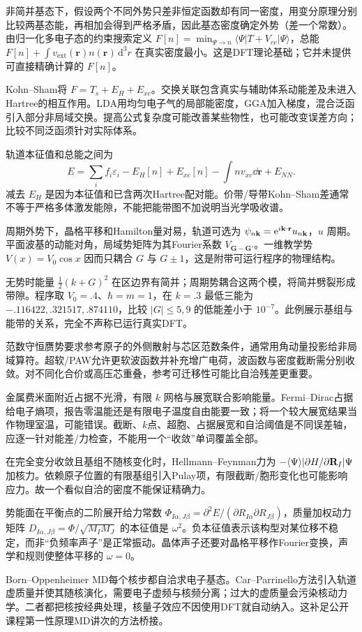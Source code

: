 非简并基态下，假设两个不同外势只差非恒定函数却有同一密度，用变分原理分别比较两基态能，再相加会得到严格矛盾，因此基态密度确定外势（差一个常数）。由归一化多电子态的约束搜索定义 $F[n]=\min_{\Psi\to n}\langle\Psi|T+V_{ee}|\Psi\rangle$，总能 $F[n]+\int v_{\mathrm{ext}}(\mathbf r)n(\mathbf r)\,\mathrm d^3r$ 在真实密度最小。这是DFT理论基础；它并未提供可直接精确计算的 $F[n]$。

Kohn--Sham将 $F=T_s+E_H+E_{xc}$。交换关联包含真实与辅助体系动能差及未进入Hartree的相互作用。LDA用均匀电子气的局部能密度，GGA加入梯度，混合泛函引入部分非局域交换。提高公式复杂度可能改善某些物性，也可能改变误差方向；比较不同泛函须针对实际体系。

轨道本征值和总能之间为
\[
E=\sum_i f_i\varepsilon_i-E_H[n]+E_{xc}[n]-\int n v_{xc}\dd\mathbf r+E_{NN}.
\]
减去 $E_H$ 是因为本征值和已含两次Hartree配对能。价带/导带Kohn--Sham差通常不等于严格多体激发能隙，不能把能带图不加说明当光学吸收谱。

周期外势下，晶格平移和Hamilton量对易，轨道可选为 $\psi_{n\mathbf k}=\mathrm e^{i\mathbf k\cdot\mathbf r}u_{n\mathbf k}$，$u$ 周期。平面波基的动能对角，局域势矩阵为其Fourier系数 $V_{\mathbf G-\mathbf G'}$。一维教学势 $V(x)=V_0\cos x$ 因而只耦合 $G$ 与 $G\pm1$，这是附带可运行程序的物理结构。

无势时能量 $\tfrac12(k+G)^2$ 在区边界有简并；周期势耦合这两个模，将简并劈裂形成带隙。程序取 $V_0=.4$、$\hbar=m=1$，在 $k=.3$ 最低三能为 $-.116422,.321517,.874110$，比较 $|G|\le5,9$ 的低能差小于 $10^{-7}$。此例展示基组与能带的关系，完全不声称已运行真实DFT。

范数守恒赝势要求参考原子的外侧散射与芯区范数条件，通常用角动量投影给非局域算符。超软/PAW允许更软波函数并补充增广电荷，波函数与密度截断需分别收敛。对不同化合价或高压芯重叠，参考可迁移性可能比自洽残差更重要。

金属费米面附近占据不光滑，有限 $k$ 网格与展宽联合影响能量。Fermi--Dirac占据给电子熵项，报告零温能还是有限电子温度自由能要一致；将一个较大展宽结果当作物理室温，可能错误。截断、$k$点、超胞、占据展宽和自洽阈值是不同误差轴，应逐一针对能差/力检查，不能用一个“收敛”单词覆盖全部。

在完全变分收敛且基组不随核变化时，Hellmann--Feynman力为 $-\langle \Psi\rangle|\partial H/\partial\mathbf R_I|\Psi$ 加核力。依赖原子位置的有限基组引入Pulay项，有限截断/胞形变化也可能影响应力。故一个看似自洽的密度不能保证精确力。

势能面在平衡点的二阶展开给力常数 $\Phi_{I\alpha,J\beta}=\partial^2E/(\partial R_{I\alpha}\partial R_{J\beta})$，质量加权动力矩阵 $D_{I\alpha,J\beta}=\Phi/\sqrt{M_IM_J}$ 的本征值是 $\omega^2$。负本征值表示该构型对某位移不稳定，而非“负频率声子”是正常振动。晶体声子还要对晶格平移作Fourier变换，声学和规则使整体平移的 $\omega=0$。

Born--Oppenheimer MD每个核步都自洽求电子基态。Car--Parrinello方法引入轨道虚质量并使其随核演化，需要电子虚频与核频分离；过大的虚质量会污染核动力学。二者都把核按经典处理，核量子效应不因使用DFT就自动纳入。这补足公开课程第一性原理MD讲次的方法桥接。
